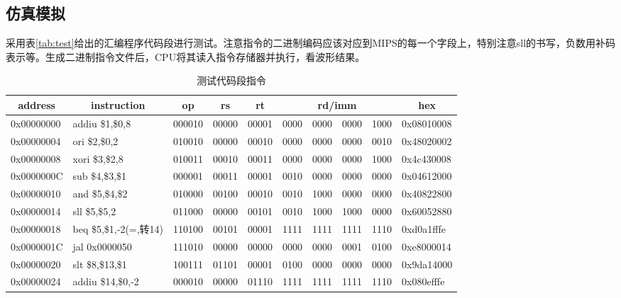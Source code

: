
\subsection{仿真模拟}
\qquad 采用表\ref{tab:test}给出的汇编程序代码段进行测试。注意指令的二进制编码应该对应到MIPS的每一个字段上，特别注意sll的书写，负数用补码表示等。生成二进制指令文件后，CPU将其读入指令存储器并执行，看波形结果。
\begin{table}[htbp]
  \centering\xiaowu
  \caption{测试代码段指令}
    \begin{tabular}{|l|l|l|l|l|llll|l|}
    \hline
    \multicolumn{1}{|c|}{address} & \multicolumn{1}{c|}{instruction} & \multicolumn{1}{c|}{op} & \multicolumn{1}{c|}{rs} & \multicolumn{1}{c|}{rt} & \multicolumn{4}{c|}{rd/imm}   & \multicolumn{1}{c|}{hex} \bigstrut\\
    \hline
    0x00000000 & addiu  \$1,\$0,8 & 000010 & 00000 & 00001 & 0000  & 0000  & 0000  & 1000  & 0x08010008 \bigstrut\\
    \hline
    0x00000004 & ori  \$2,\$0,2 & 010010 & 00000 & 00010 & 0000  & 0000  & 0000  & 0010  & 0x48020002 \bigstrut\\
    \hline
    0x00000008 & xori  \$3,\$2,8 & 010011 & 00010 & 00011 & 0000  & 0000  & 0000  & 1000  & 0x4c430008 \bigstrut\\
    \hline
    0x0000000C & sub  \$4,\$3,\$1 & 000001 & 00011 & 00001 & 0010  & 0000  & 0000  & 0000  & 0x04612000 \bigstrut\\
    \hline
    0x00000010 & and  \$5,\$4,\$2 & 010000 & 00100 & 00010 & 0010  & 1000  & 0000  & 0000  & 0x40822800 \bigstrut\\
    \hline
    0x00000014 & sll   \$5,\$5,2 & 011000 & 00000 & 00101 & 0010  & 1000  & 1000  & 0000  & 0x60052880 \bigstrut\\
    \hline
    0x00000018 & beq  \$5,\$1,-2(=,转14) & 110100 & 00101 & 00001 & 1111  & 1111  & 1111  & 1110  & 0xd0a1fffe \bigstrut\\
    \hline
    0x0000001C & jal  0x0000050 & 111010 & 00000 & 00000 & 0000  & 0000  & 0001  & 0100  & 0xe8000014 \bigstrut\\
    \hline
    0x00000020 & slt  \$8,\$13,\$1 & 100111 & 01101 & 00001 & 0100  & 0000  & 0000  & 0000  & 0x9da14000 \bigstrut\\
    \hline
    0x00000024 & addiu  \$14,\$0,-2 & 000010 & 00000 & 01110 & 1111  & 1111  & 1111  & 1110  & 0x080efffe \bigstrut\\

\end{tabular}
\end{table}
